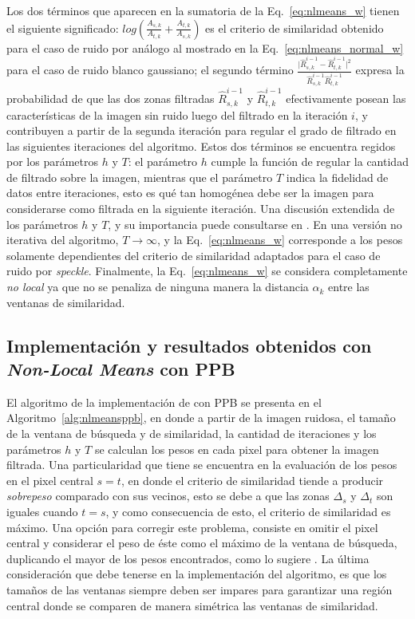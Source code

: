 Los dos términos que aparecen en la sumatoria de la Eq.~\ref{eq:nlmeans_w} tienen el siguiente significado: $log\left(\frac{A_{s,k}}{A_{t,k}} + \frac{A_{t,k}}{A_{s,k}}\right)$ es el criterio de similaridad obtenido para el caso de ruido por \speckle análogo al mostrado en la Eq.~\ref{eq:nlmeans_normal_w} para el caso de ruido blanco gaussiano; el segundo término $\frac{\big\lvert\hat{R}^{i-1}_{s,k} - \hat{R}^{i-1}_{t,k}\big\rvert^2}{\hat{R}^{i-1}_{s,k}\hat{R}^{i-1}_{t,k}}$ expresa la probabilidad de que las dos zonas filtradas $\hat{R}^{i-1}_{s,k}$ y $\hat{R}^{i-1}_{t,k}$ efectivamente posean las características de la imagen sin ruido luego del filtrado en la iteración $i$, y contribuyen a partir de la segunda iteración para regular el grado de filtrado en las siguientes iteraciones del algoritmo. Estos dos términos se encuentra regidos por los parámetros $h$ y $T$: el parámetro $h$ cumple la función de regular la cantidad de filtrado sobre la imagen, mientras que el parámetro $T$ indica la fidelidad de datos entre iteraciones, esto es qué tan homogénea debe ser la imagen para considerarse como filtrada en la siguiente iteración. Una discusión extendida de los parámetros $h$ y $T$, y su importancia puede consultarse en \cite{Polzehl2006}. En una versión no iterativa del algoritmo, $T\rightarrow\infty$, y la Eq.~\ref{eq:nlmeans_w} corresponde a los pesos solamente dependientes del criterio de similaridad adaptados para el caso de ruido por \textit{speckle}. Finalmente, la Eq.~\ref{eq:nlmeans_w} se considera completamente \textit{no local} ya que no se penaliza de ninguna manera la distancia $\alpha_k$ entre las ventanas de similaridad.

\subsection{Implementación y resultados obtenidos con \textit{Non-Local Means} con PPB}
\label{sec:imple_result_nlmeansPPB}

El algoritmo de la implementación de \nlmeans con PPB se presenta en el Algoritmo~\ref{alg:nlmeansppb}, en donde a partir de la imagen ruidosa, el tamaño de la ventana de búsqueda y de similaridad, la cantidad de iteraciones y los parámetros $h$ y $T$ se calculan los pesos en cada pixel para obtener la imagen filtrada. Una particularidad que tiene \nlmeans se encuentra en la evaluación de los pesos en el pixel central $s=t$, en donde el criterio de similaridad tiende a producir \textit{sobrepeso} comparado con sus vecinos, esto se debe a que las zonas $\Delta_s$ y $\Delta_t$ son iguales cuando $t=s$, y como consecuencia de esto, el criterio de similaridad es máximo. Una opción para corregir este problema, consiste en omitir el pixel central y considerar el peso de éste como el máximo de la ventana de búsqueda, duplicando el mayor de los pesos encontrados, como lo sugiere \cite{Zhang2014}. La última consideración que debe tenerse en la implementación del algoritmo, es que los tamaños de las ventanas siempre deben ser impares para garantizar una región central donde se comparen de manera simétrica las ventanas de similaridad.


